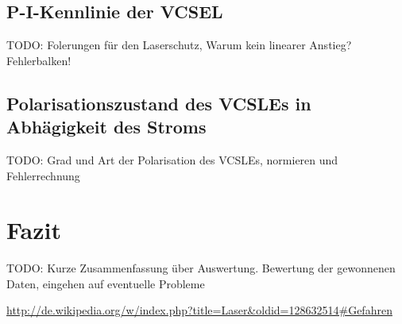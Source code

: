 \documentclass[bigchapter,colorback,accentcolor=tud4b,linedtoc,11pt]{tudreport}
\numberwithin{equation}{subsection}
\begin{document}
\section{P-I-Kennlinie der VCSEL}
TODO: Folerungen für den Laserschutz, Warum kein linearer Anstieg? Fehlerbalken!

\section{Polarisationszustand des VCSLEs in Abhägigkeit des Stroms}
TODO: Grad und Art der Polarisation des VCSLEs, normieren und Fehlerrechnung
\chapter{Fazit}
TODO: Kurze Zusammenfassung über Auswertung. Bewertung der gewonnenen Daten, eingehen auf eventuelle Probleme

\cleardoublepage{}
\newpage
\begin{thebibliography}{100}
   \url{http://de.wikipedia.org/w/index.php?title=Laser&oldid=128632514#Gefahren}
\end{thebibliography}

\cleardoublepage{}
\end{document}
